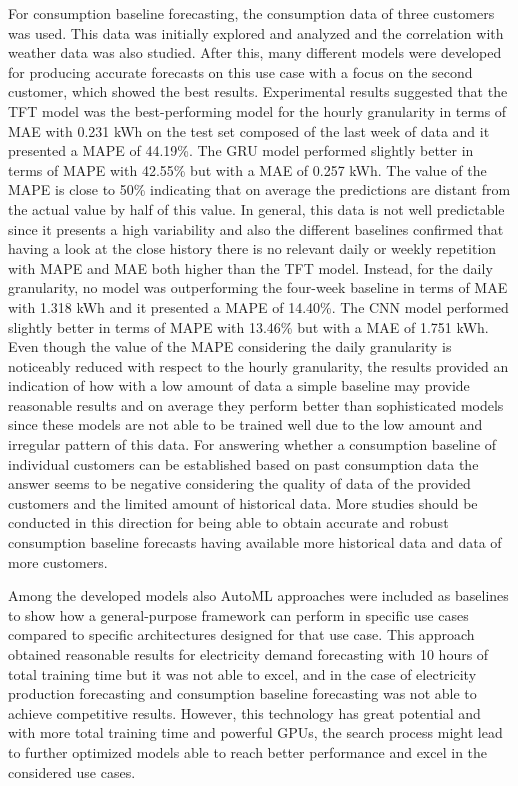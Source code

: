 For consumption baseline forecasting, the consumption data of three customers was used.
This data was initially explored and analyzed and the correlation with weather data was also studied.
After this, many different models were developed for producing accurate forecasts on this use case with a focus on the second customer, which showed the best results.
Experimental results suggested that the TFT model was the best-performing model for the hourly granularity in terms of MAE with 0.231 kWh on the test set composed of the last week of data and it presented a MAPE of 44.19\%.
The GRU model performed slightly better in terms of MAPE with 42.55\% but with a MAE of 0.257 kWh.
The value of the MAPE is close to 50\% indicating that on average the predictions are distant from the actual value by half of this value.
In general, this data is not well predictable since it presents a high variability and also the different baselines confirmed that having a look at the close history there is no relevant daily or weekly repetition with MAPE and MAE both higher than the TFT model.
Instead, for the daily granularity, no model was outperforming the four-week baseline in terms of MAE with 1.318 kWh and it presented a MAPE of 14.40\%.
The CNN model performed slightly better in terms of MAPE with 13.46\% but with a MAE of 1.751 kWh.
Even though the value of the MAPE considering the daily granularity is noticeably reduced with respect to the hourly granularity, the results provided an indication of how with a low amount of data a simple baseline may provide reasonable results and on average they perform better than sophisticated models since these models are not able to be trained well due to the low amount and irregular pattern of this data.
For answering whether a consumption baseline of individual customers can be established based on past consumption data the answer seems to be negative considering the quality of data of the provided customers and the limited amount of historical data.
More studies should be conducted in this direction for being able to obtain accurate and robust consumption baseline forecasts having available more historical data and data of more customers.

Among the developed models also AutoML approaches were included as baselines to show how a general-purpose framework can perform in specific use cases compared to specific architectures designed for that use case.
This approach obtained reasonable results for electricity demand forecasting with 10 hours of total training time but it was not able to excel, and in the case of electricity production forecasting and consumption baseline forecasting was not able to achieve competitive results.
However, this technology has great potential and with more total training time and powerful GPUs, the search process might lead to further optimized models able to reach better performance and excel in the considered use cases.

